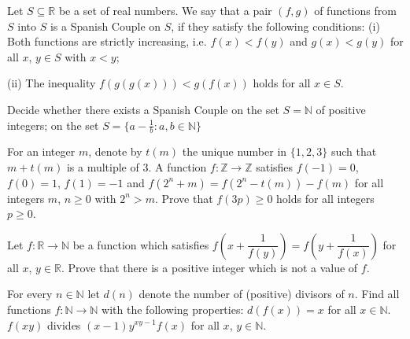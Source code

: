 \documentclass[11pt]{scrartcl}
\begin{document}
\begin{Problem}
Let $ S\subseteq\mathbb{R}$ be a set of real numbers. We say that a pair $ (f, g)$ of functions from $ S$ into $ S$ is a Spanish Couple on $ S$, if they satisfy the following conditions:
(i) Both functions are strictly increasing, i.e. $ f(x) < f(y)$ and $ g(x) < g(y)$ for all $ x$, $ y\in S$ with $ x < y$;

(ii) The inequality $ f\left(g\left(g\left(x\right)\right)\right) < g\left(f\left(x\right)\right)$ holds for all $ x\in S$.

Decide whether there exists a Spanish Couple
on the set $ S = \mathbb{N}$ of positive integers;
on the set $ S = \{a - \frac {1}{b}: a, b\in\mathbb{N}\}$
\end{Problem}




\begin{Problem}
For an integer $ m$, denote by $ t(m)$ the unique number in $ \{1, 2, 3\}$ such that $ m + t(m)$ is a multiple of $ 3$. A function $ f: \mathbb{Z}\to\mathbb{Z}$ satisfies $ f( - 1) = 0$, $ f(0) = 1$, $ f(1) = - 1$ and $ f\left(2^{n} + m\right) = f\left(2^n - t(m)\right) - f(m)$ for all integers $ m$, $ n\ge 0$ with $ 2^n > m$. Prove that $ f(3p)\ge 0$ holds for all integers $ p\ge 0$.
\end{Problem}



\begin{Problem}
Let $ f: \mathbb{R}\to\mathbb{N}$ be a function which satisfies $ f\left(x + \dfrac{1}{f(y)}\right) = f\left(y + \dfrac{1}{f(x)}\right)$ for all $ x$, $ y\in\mathbb{R}$. Prove that there is a positive integer which is not a value of $ f$.
\end{Problem}



\begin{Problem}
For every $ n\in\mathbb{N}$ let $ d(n)$ denote the number of (positive) divisors of $ n$. Find all functions $ f: \mathbb{N}\to\mathbb{N}$ with the following properties:
$ d\left(f(x)\right) = x$ for all $ x\in\mathbb{N}$.
$ f(xy)$ divides $ (x - 1)y^{xy - 1}f(x)$ for all $ x$, $ y\in\mathbb{N}$.
\end{Problem}
\end{document}

